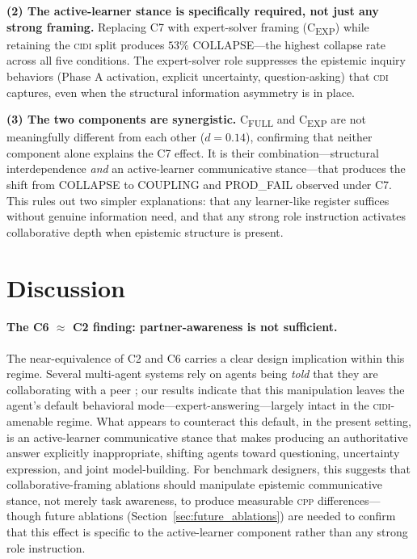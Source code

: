 \documentclass{article}
\newcommand{\CDI}{\textsc{cdi}}
\newcommand{\CPP}{\textsc{cpp}}
\newcommand{\CIDI}{\textsc{cidi}}
\begin{document}
\textbf{(2) The active-learner stance is specifically required, not just
any strong framing.} Replacing C7 with expert-solver framing
(C\textsubscript{EXP}) while retaining the \CIDI{} split produces $53\%$
COLLAPSE---the highest collapse rate across all five conditions. The
expert-solver role suppresses the epistemic inquiry behaviors (Phase A
activation, explicit uncertainty, question-asking) that \CDI{} captures,
even when the structural information asymmetry is in place.

\textbf{(3) The two components are synergistic.}
C\textsubscript{FULL} and C\textsubscript{EXP} are not meaningfully
different from each other ($d = 0.14$), confirming that neither component
alone explains the C7 effect. It is their combination---structural
interdependence \emph{and} an active-learner communicative stance---that
produces the shift from COLLAPSE to COUPLING and PROD\_FAIL observed
under C7. This rules out two simpler explanations: that any learner-like
register suffices without genuine information need, and that any strong
role instruction activates collaborative depth when epistemic structure
is present.

\section{Discussion}
\label{sec:discussion}

\paragraph{The C6 $\approx$ C2 finding: partner-awareness is not sufficient.}
The near-equivalence of C2 and C6 carries a clear design implication
within this regime. Several multi-agent systems rely on agents being
\emph{told} that they are collaborating with a peer
\citep{liang2023encouraging, du2023improving}; our results indicate
that this manipulation leaves the agent's default behavioral
mode---expert-answering---largely intact in the \CIDI-amenable regime.
What appears to counteract this default, in the present setting, is an
active-learner communicative stance that makes producing an authoritative
answer explicitly inappropriate, shifting agents toward questioning,
uncertainty expression, and joint model-building. For benchmark
designers, this suggests that collaborative-framing ablations should
manipulate epistemic communicative stance, not merely task awareness,
to produce measurable \CPP{} differences---though future ablations
(Section~\ref{sec:future_ablations}) are needed to confirm that this
effect is specific to the active-learner component rather than any
strong role instruction.
\end{document}
